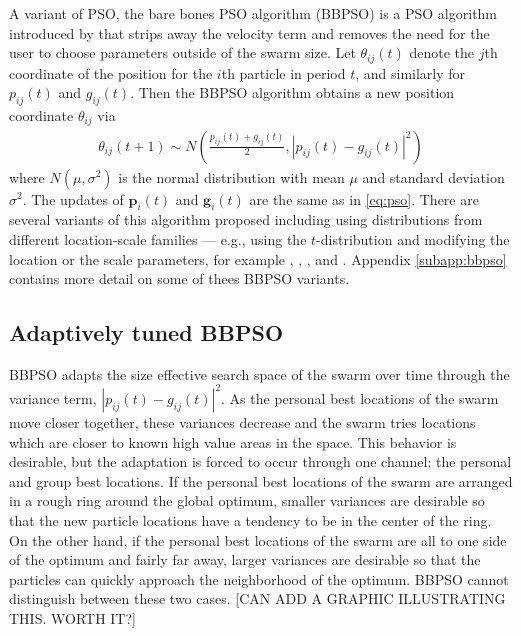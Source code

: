 \documentclass[12pt]{article}
\begin{document}
A variant of PSO, the bare bones PSO algorithm (BBPSO) is a PSO algorithm introduced by \citet{kennedy2003bare} that strips away the velocity term and removes the need for the user to choose parameters outside of the swarm size. Let $\theta_{ij}(t)$ denote the $j$th coordinate of the position for the $i$th particle in period $t$, and similarly for $p_{ij}(t)$ and $g_{ij}(t)$. Then the BBPSO algorithm obtains a new position coordinate $\theta_{ij}$ via
\begin{align}\label{eq:bbpso}
\theta_{ij}(t+1) \sim N\left(\frac{p_{ij}(t) + g_{ij}(t)}{2}, |p_{ij}(t) - g_{ij}(t)|^2\right)
\end{align}
where $N(\mu,\sigma^2)$ is the normal distribution with mean $\mu$ and standard deviation $\sigma^2$. The updates of $\bm{p}_i(t)$ and $\bm{g}_i(t)$ are the same as in \eqref{eq:pso}. There are several variants of this algorithm proposed including using distributions from different location-scale families --- e.g., using the $t$-distribution and modifying the location or the scale parameters, for example \citet{krohling2009bare}, \citet{hsieh2010modified}, \citet{richer2006levy}, and \citet{campos2014bare}. Appendix \ref{subapp:bbpso} contains more detail on some of thees BBPSO variants.

\subsection{Adaptively tuned BBPSO}\label{subsec:ATBBPSO}
BBPSO adapts the size effective search space of the swarm over time through the variance term, $|p_{ij}(t) - g_{ij}(t)|^2$. As the personal best locations of the swarm move closer together, these variances decrease and the swarm tries locations which are closer to known high value areas in the space. This behavior is desirable, but the adaptation is forced to occur through one channel: the personal and group best locations. If the personal best locations of the swarm are arranged in a rough ring around the global optimum, smaller variances are desirable so that the new particle locations have a tendency to be in the center of the ring. On the other hand, if the personal best locations of the swarm are all to one side of the optimum and fairly far away, larger variances are desirable so that the particles can quickly approach the neighborhood of the optimum. BBPSO cannot distinguish between these two cases. [CAN ADD A GRAPHIC ILLUSTRATING THIS. WORTH IT?] 
\end{document}
